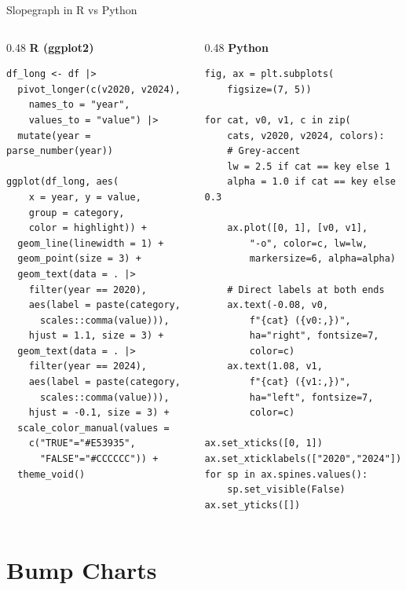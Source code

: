 \documentclass[10pt]{beamer}
\begin{document}
\begin{frame}[fragile]{Slopegraph in R vs Python}
  \begin{columns}[T]
    \begin{column}{0.48\textwidth}
      \textbf{R (ggplot2)}
\begin{lstlisting}[style=rstyle]
df_long <- df |>
  pivot_longer(c(v2020, v2024),
    names_to = "year",
    values_to = "value") |>
  mutate(year = parse_number(year))

ggplot(df_long, aes(
    x = year, y = value,
    group = category,
    color = highlight)) +
  geom_line(linewidth = 1) +
  geom_point(size = 3) +
  geom_text(data = . |>
    filter(year == 2020),
    aes(label = paste(category,
      scales::comma(value))),
    hjust = 1.1, size = 3) +
  geom_text(data = . |>
    filter(year == 2024),
    aes(label = paste(category,
      scales::comma(value))),
    hjust = -0.1, size = 3) +
  scale_color_manual(values =
    c("TRUE"="#E53935",
      "FALSE"="#CCCCCC")) +
  theme_void()
\end{lstlisting}
    \end{column}
    \begin{column}{0.48\textwidth}
      \textbf{Python}
\begin{lstlisting}[style=pythonstyle]
fig, ax = plt.subplots(
    figsize=(7, 5))

for cat, v0, v1, c in zip(
    cats, v2020, v2024, colors):
    # Grey-accent
    lw = 2.5 if cat == key else 1
    alpha = 1.0 if cat == key else 0.3

    ax.plot([0, 1], [v0, v1],
        "-o", color=c, lw=lw,
        markersize=6, alpha=alpha)

    # Direct labels at both ends
    ax.text(-0.08, v0,
        f"{cat} ({v0:,})",
        ha="right", fontsize=7,
        color=c)
    ax.text(1.08, v1,
        f"{cat} ({v1:,})",
        ha="left", fontsize=7,
        color=c)

ax.set_xticks([0, 1])
ax.set_xticklabels(["2020","2024"])
for sp in ax.spines.values():
    sp.set_visible(False)
ax.set_yticks([])
\end{lstlisting}
    \end{column}
  \end{columns}
\end{frame}

\section{Bump Charts}
\end{document}
